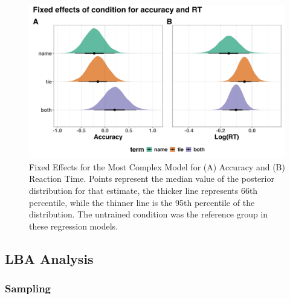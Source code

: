 \documentclass[
  man,floatsintext]{apa6}
\begin{document}
\begin{figure}[H]

{\centering \includegraphics[height=0.67\textheight,]{../../figures/manifest/fixef} 

}

\caption{Fixed Effects for the Most Complex Model for (A) Accuracy and (B) Reaction Time. Points represent the median value of the posterior distribution for that estimate, the thicker line represents 66th percentile, while the thinner line is the 95th percentile of the distribution. The untrained condition was the reference group in these regression models.}\label{fig:fixef-plot}
\end{figure}

\subsection{LBA Analysis}\label{lba-analysis}

\subsubsection{Sampling}\label{sampling}
\end{document}
